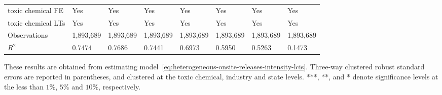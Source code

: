 \begin{table}[H]
{\begin{tabular}{@{}llllllll@{}}
            toxic chemical FE                     & Yes       & Yes           & Yes       & Yes          & Yes             & Yes           & Yes                 \\
            toxic chemical LTs                    & Yes       & Yes           & Yes       & Yes          & Yes             & Yes           & Yes                 \\ \midrule \midrule
            Observations                          & 1,893,689 & 1,893,689     & 1,893,689 & 1,893,689    & 1,893,689       & 1,893,689     & 1,893,689           \\
            $R^2$                                 & 0.7474    & 0.7686        & 0.7441    & 0.6973       & 0.5950          & 0.5263        & 0.1473              \\ \bottomrule\bottomrule
        \end{tabular}%
    }
    \begin{minipage}{18cm}
        \vspace{0.05in}
        These results are obtained from estimating model~\ref{eq:heterogeneous-onsite-releases-intensity-lcis}. Three-way clustered robust standard errors are reported in parentheses, and clustered at the toxic chemical, industry and state levels. ***, **, and * denote significance levels at the less than $1\%$, $5\%$ and $10\%$, respectively.
    \end{minipage}
\end{table}